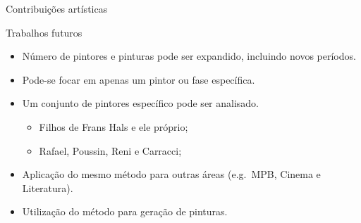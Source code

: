 \documentclass{beamer}
\begin{document}
\begin{frame}{Contribuições artísticas}
\end{frame}

\begin{frame}{Trabalhos futuros}
  \begin{itemize}
    \item<1> Número de pintores e pinturas pode ser expandido, incluindo novos períodos.

    \item<2> Pode-se focar em apenas um pintor ou fase específica.

    \item<3>{Um conjunto de pintores específico pode ser analisado.
    \begin{itemize}
      \item Filhos de Frans Hals e ele próprio;
      \item Rafael, Poussin, Reni e Carracci;
    \end{itemize}
    }

    \item<4> Aplicação do mesmo método para outras áreas (e.g.\ MPB, Cinema e Literatura).

    \item<5> Utilização do método para geração de pinturas.

  \end{itemize}

\end{frame}
\end{document}
